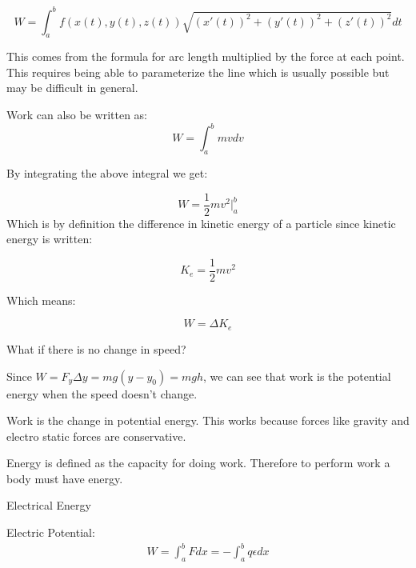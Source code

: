\documentclass{report}
\begin{document}
\begin{description}
\begin{mdframed}
            \begin{displaymath}
                W = \int_a^b f(x(t), y(t), z(t)) 
                \sqrt{(x'(t))^2 + (y'(t))^2 + (z'(t))^2} dt
            \end{displaymath}

            This comes from the formula for arc length multiplied
            by the force at each point. This requires being able
            to parameterize the line which is usually possible
            but may be difficult in general.

            Work can also be written as:
            \begin{displaymath}
                W = \int_a^b m v dv
            \end{displaymath}

            By integrating the above integral we get:

            \begin{displaymath}
            W = \frac{1}{2}mv^2 {\bigg |_a^b}
            \end{displaymath}
            Which is by definition the difference in kinetic
            energy of a particle since kinetic energy is written:

            \begin{displaymath}
                K_e = \frac{1}{2} mv^2
            \end{displaymath}

            Which means:

            \begin{displaymath}
                W = \Delta K_e
            \end{displaymath}
        \end{mdframed}
        \begin{mdframed}
            What if there is no change in speed?

            \vspace{10pt}

            Since $W = F_y \Delta y = mg(y - y_0)
            = mgh$, we can see that work is the potential
            energy when the speed doesn't change.

            Work is the change in potential energy. This works
            because forces like gravity and electro static forces
            are conservative.

            Energy is defined as the capacity for doing work.
            Therefore to perform work a body must have energy.
        \end{mdframed}
        \pagebreak
    \item {\large Electrical Energy}
        \begin{mdframed}
            Electric Potential:
            \begin{gather}
                W = \int_a^b F dx 
                = -\int_a^b q \epsilon dx
            \end{gather}
        \end{mdframed}
\end{description}
\end{document}
